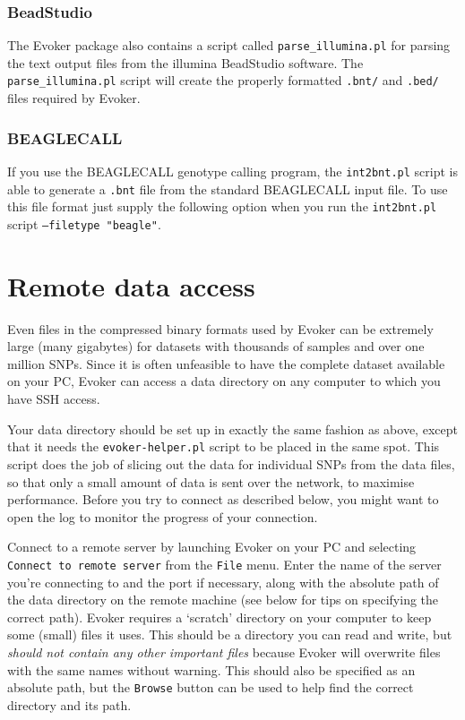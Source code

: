 \documentclass{article}
\begin{document}
\subsubsection{BeadStudio}
The Evoker package also contains a script called \texttt{parse\_illumina.pl} for parsing the text output files from the illumina BeadStudio software. The \texttt{parse\_illumina.pl} script will create the properly formatted \texttt{.bnt/} and \texttt{.bed/} files required by Evoker. 

\subsubsection{BEAGLECALL}
If you use the BEAGLECALL genotype calling program, the \texttt{int2bnt.pl} script is able to generate a \texttt{.bnt} file from the standard BEAGLECALL input file. To use this file format just supply the following option when you run the \texttt{int2bnt.pl} script \texttt{--filetype "beagle"}.

\section{Remote data access}

Even files in the compressed binary formats used by Evoker can be extremely large (many gigabytes) for datasets with thousands of samples and over one million SNPs. Since it is often unfeasible to have the complete dataset available on your PC, Evoker can access a data directory on any computer to which you have SSH access.

Your data directory should be set up in exactly the same fashion as above, except that it needs the \texttt{evoker-helper.pl} script to be placed in the same spot. This script does the job of slicing out the data for individual SNPs from the data files, so that only a small amount of data is sent over the network, to maximise performance. Before you try to connect as described below, you might want to open the log to monitor the progress of your connection.

Connect to a remote server by launching Evoker on your PC and selecting \texttt{Connect to remote server} from the \texttt{File} menu. Enter the name of the server you're connecting to and the port if necessary, along with the absolute path of the data directory on the remote machine (see below for tips on specifying the correct path). Evoker requires a `scratch' directory on your computer to keep some (small) files it uses. This should be a directory you can read and write, but \emph{should not contain any other important files} because Evoker will overwrite files with the same names without warning. This should also be specified as an absolute path, but the \texttt{Browse} button can be used to help find the correct directory and its path.
\end{document}
